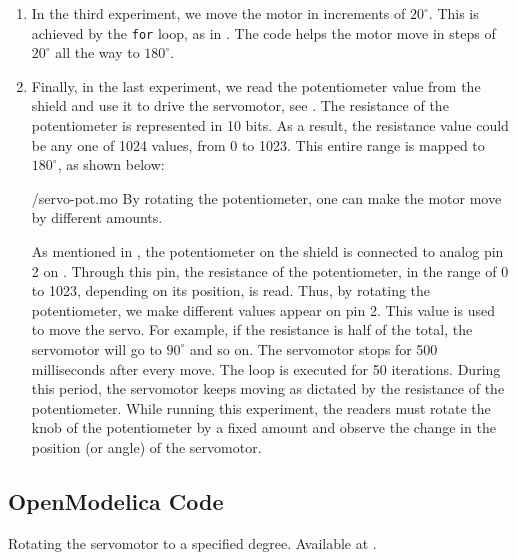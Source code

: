 \begin{enumerate}
        
  \item In the third experiment, we move the motor in increments of
        $20^\circ$.  This is achieved by the {\tt for} loop, as in
        . The code helps the motor move in steps of $20^\circ$ all
        the way to $180^\circ$.  
        
  \item Finally, in the last experiment, we read the potentiometer value
        from the shield and use it to drive the servomotor, see
        .  The resistance of the potentiometer is
        represented in 10 bits.  As a result, the resistance value could be
        any one of 1024 values, from 0 to 1023.  This entire range is
        mapped to $180^\circ$, as shown below:
        
        {\LocSEROpenModelicacode/servo-pot.mo}
        By rotating the potentiometer, one can make
        the motor move by different amounts.
        
        As mentioned in , the potentiometer on the shield is connected 
        to analog pin 2 on \arduino. Through this pin, the resistance of the potentiometer, in the range of 0 to 1023,
        depending on its position, is read.  Thus, by rotating the
        potentiometer, we make different values appear on pin 2.  This value
        is used to move the servo.  For example, if the resistance is half
        of the total, the servomotor will go to $90^\circ$ and so on.  The
        servomotor stops for 500 milliseconds after every move.  The loop is
        executed for 50 iterations. During this period, the servomotor keeps moving as dictated by the
        resistance of the potentiometer. While running this experiment, the readers 
        must rotate the knob of the potentiometer by a fixed amount and observe 
        the change in the position (or angle) of the servomotor. 
        
\end{enumerate}

\subsection{OpenModelica Code}
\lstset{style=mystyle}
\label{sec:servo-OpenModelica-code}

\begin{OpenModelicacode}
   {Rotating
    the servomotor to a specified degree.  Available at
    .}
  \label{OpenModelica:servo-init}
  
\end{OpenModelicacode}

